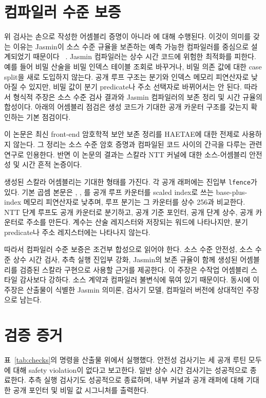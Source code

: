 \documentclass[10pt,twocolumn]{article}
\newcommand{\jasmin}{Jasmin}
\newcommand{\ct}{상수 시간}
\begin{document}
\section{컴파일러 수준 보증}

위 검사는 손으로 작성한 어셈블리 증명이 아니라 
에 대해 수행된다. 이것이 의미를 갖는 이유는 \jasmin{}이 소스 수준
규율을 보존하는 예측 가능한 컴파일러를 중심으로 설계되었기 때문이다
~\cite{Jasmin2017,LastMile2020,JasminFramework2026}. \jasmin{} 컴파일러는 \ct{} 코드에 위험한 최적화를
피한다. 예를 들어 비밀 산술을 비밀 인덱스 테이블 조회로 바꾸거나,
비밀 의존 값에 대한 case split을 새로 도입하지 않는다. 공개 루프
구조는 분기와 인덱스 메모리 피연산자로 낮아질 수 있지만, 비밀 값이
분기 predicate나 주소 선택자로 바뀌어서는 안 된다. 따라서 형식적 주장은 소스 수준
검사 결과와 \jasmin{} 컴파일러의 보존 정리 및 시간 규율의 합성이다.
아래의 어셈블리 점검은 생성 코드가 기대한 공개 카운터 구조를 갖는지
확인하는 기본 점검이다.

이 논문은 최신 front-end 암호학적 보안 보존 정리를 HAETAE에 대한
전제로 사용하지 않는다. 그 정리는 소스 수준 암호 증명과 컴파일된 코드
사이의 간극을 다루는 관련 연구로 인용한다. 반면 이 논문의 결과는
스칼라 NTT 커널에 대한 소스-어셈블리 안전성 및 시간 흔적 논증이다.

생성된 스칼라 어셈블리는 기대한 형태를 가진다. 각 공개 래퍼에는 진입부
\texttt{lfence}가 있다. 기본 곱셈 본문은 , ,
를 공개 루프 카운터를 scaled index로 쓰는 base-plus-index
메모리 피연산자로 낮추며, 루프 분기는 그 카운터를 상수 256과 비교한다.
NTT 단계 루프도 공개 카운터로 분기하고, 공개 기준 포인터, 공개 단계
상수, 공개 카운터로 주소를 만든다. 계수는 산술 레지스터와 저장되는
워드에 나타나지만, 분기 predicate나 주소 레지스터에는 나타나지 않는다.

따라서 컴파일러 수준 보증은 조건부 합성으로 읽어야 한다. 소스 수준
안전성, 소스 수준 \ct{} 검사, 추측 실행 진입부 강화, \jasmin{}의
보존 규율이 함께 생성된 어셈블리를 검증된 스칼라 구현으로 사용할
근거를 제공한다. 이 주장은 수작업 어셈블리 스타일 감사보다 강하다.
소스 계약과 컴파일러 불변식에 묶여 있기 때문이다. 동시에 이 주장은
산출물이 식별한 \jasmin{} 의미론, 검사기 모델, 컴파일러 버전에 상대적인
주장으로 남는다.

\section{검증 증거}
\label{sec:evidence}

표~\ref{tab:checks}의 명령을 산출물 위에서 실행했다. 안전성 검사기는
세 공개 루틴 모두에 대해 safety violation이 없다고 보고한다. 일반
\ct{} 검사기는 성공적으로 종료한다. 추측 실행 검사기도 성공적으로
종료하며, 내부 커널과 공개 래퍼에 대해 기대한 공개 포인터 및 비밀 값
시그니처를 출력한다.
\end{document}
